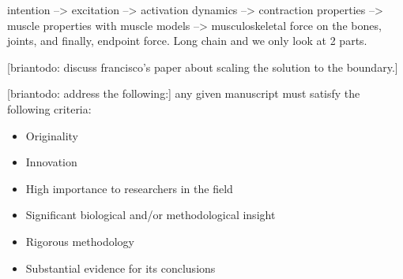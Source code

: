 intention --> excitation --> activation dynamics --> contraction properties --> muscle properties with muscle models --> musculoskeletal force on the bones, joints, and finally, endpoint force. Long chain and we only look at 2 parts.

[briantodo: discuss francisco's paper about scaling the solution to the boundary.]


[briantodo: address the following:]
any given manuscript must satisfy the following criteria:
\begin{itemize}
	\item {Originality}
	\item {Innovation}
	\item {High importance to researchers in the field}
	\item {Significant biological and/or methodological insight}
	\item {Rigorous methodology}
	\item {Substantial evidence for its conclusions}
\end{itemize}


